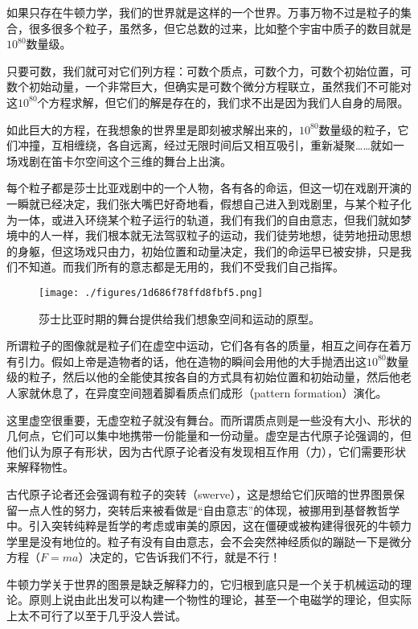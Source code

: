 如果只存在牛顿力学，我们的世界就是这样的一个世界。万事万物不过是粒子的集合，很多很多个粒子，虽然多，但它总数的过来，比如整个宇宙中质子的数目就是$10^{80}$数量级。

只要可数，我们就可对它们列方程：可数个质点，可数个力，可数个初始位置，可数个初始动量，一个非常巨大，但确实是可数个微分方程联立，虽然我们不可能对这$10^{80}$个方程求解，但它们的解是存在的，我们求不出是因为我们人自身的局限。

如此巨大的方程，在我想象的世界里是即刻被求解出来的，$10^{80}$数量级的粒子，它们冲撞，互相缠绕，各自远离，经过无限时间后又相互吸引，重新凝聚……就如一场戏剧在笛卡尔空间这个三维的舞台上出演。

每个粒子都是莎士比亚戏剧中的一个人物，各有各的命运，但这一切在戏剧开演的一瞬就已经决定，我们张大嘴巴好奇地看，假想自己进入到戏剧里，与某个粒子化为一体，或进入环绕某个粒子运行的轨道，我们有我们的自由意志，但我们就如梦境中的人一样，我们根本就无法驾驭粒子的运动，我们徒劳地想，徒劳地扭动思想的身躯，但这场戏只由力，初始位置和动量决定，我们的命运早已被安排，只是我们不知道。而我们所有的意志都是无用的，我们不受我们自己指挥。

\begin{figure}[ht]
\centering
\texttt{[image: ./figures/1d686f78ffd8fbf5.png]}
\caption{莎⼠比亚时期的舞台提供给我们想象空间和运动的原型。} \label{fig_QMPre5_3}
\end{figure}

所谓粒子的图像就是粒子们在虚空中运动，它们各有各的质量，相互之间存在着万有引力。假如上帝是造物者的话，他在造物的瞬间会用他的大手抛洒出这$10^{80}$数量级的粒子，然后以他的全能使其按各自的方式具有初始位置和初始动量，然后他老人家就休息了，在异度空间翘着脚看质点们成形（pattern formation）演化。

这里虚空很重要，无虚空粒子就没有舞台。而所谓质点则是一些没有大小、形状的几何点，它们可以集中地携带一份能量和一份动量。虚空是古代原子论强调的，但他们认为原子有形状，因为古代原子论者没有发现相互作用（力），它们需要形状来解释物性。

古代原子论者还会强调有粒子的突转（swerve），这是想给它们灰暗的世界图景保留一点人性的努力，突转后来被看做是“自由意志”的体现，被挪用到基督教哲学中。引入突转纯粹是哲学的考虑或审美的原因，这在僵硬或被构建得很死的牛顿力学里是没有地位的。粒子有没有自由意志，会不会突然神经质似的蹦跶一下是微分方程（$F = ma$）决定的，它告诉我们不行，就是不行！

牛顿力学关于世界的图景是缺乏解释力的，它归根到底只是一个关于机械运动的理论。原则上说由此出发可以构建一个物性的理论，甚至一个电磁学的理论，但实际上太不可行了以至于几乎没人尝试。

